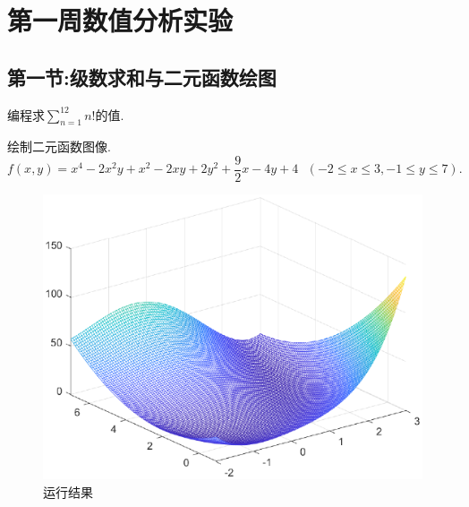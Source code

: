 \section{第一周数值分析实验}
\subsection{第一节:级数求和与二元函数绘图}
\begin{ex}
编程求$\sum_{n=1}^{12}{n!}$的值.
\end{ex}

\begin{ex}
绘制二元函数图像.
$$
f(x,y)=x^4-2x^2y+x^2-2xy+2y^2+\frac{9}{2}x-4y+4\,\,\,\,\left( -2\le x\le 3,-1\le y\le 7 \right) .
$$
\end{ex}
\begin{multicols}{2}

\qa 
\begin{figure}[H]
	\centering
	\includegraphics[width = 0.8\linewidth]{day1/q2.eps}
	\caption{运行结果}
\end{figure}
\end{multicols}
